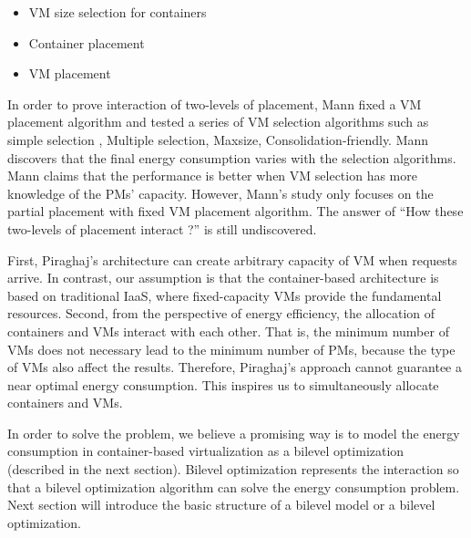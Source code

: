 \begin{itemize}
	\item VM size selection for containers
	\item Container placement
	\item VM placement
\end{itemize}

In order to prove interaction of two-levels of placement, Mann fixed a VM placement algorithm and tested a series of VM selection algorithms such as simple selection \cite{Ganesan:2012eb},  Multiple selection, Maxsize, Consolidation-friendly. Mann discovers that the final energy consumption varies with the selection algorithms. Mann claims that the performance is better when VM selection has more knowledge of the PMs' capacity. However, Mann's study only focuses on the partial placement with fixed VM placement algorithm. The answer of ``How these two-levels of placement interact ?'' is still undiscovered.


 First, Piraghaj's architecture can create arbitrary capacity of VM when requests arrive. In contrast, our assumption is that the container-based architecture is based on traditional IaaS, where fixed-capacity VMs provide the fundamental resources. Second, from the perspective of energy efficiency, the allocation of containers and VMs interact with each other. That is, the minimum number of VMs does not necessary lead to the minimum number of PMs, because the type of VMs also affect the results. Therefore, Piraghaj's approach cannot guarantee a near optimal energy consumption. This inspires us to simultaneously allocate containers and VMs. 


In order to solve the problem, we believe a promising way is to model the energy consumption in container-based virtualization as a bilevel optimization~\cite{Colson:2007bu} (described in the next section). Bilevel optimization represents the interaction so that a bilevel optimization algorithm can solve the energy consumption problem. Next section will introduce the basic structure of a bilevel model or a bilevel optimization.




